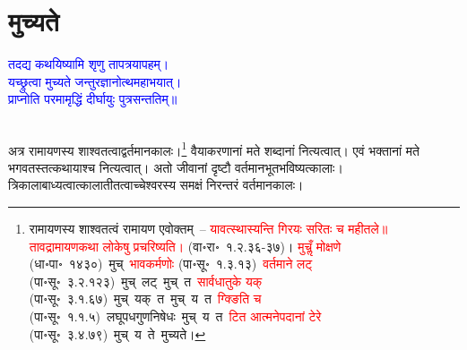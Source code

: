 \section[मुच्यते]{मुच्यते}
\centering\textcolor{blue}{तदद्य कथयिष्यामि शृणु तापत्रयापहम्।\nopagebreak\\
यच्छ्रुत्वा मुच्यते जन्तुरज्ञानोत्थमहाभयात्।\nopagebreak\\
प्राप्नोति परमामृद्धिं दीर्घायुः पुत्रसन्ततिम्॥}\nopagebreak\\
\\
\fontsize{14}{21}\selectfont\begin{sloppypar}\justifying\noindent\hspace{10mm} अत्र रामायणस्य शाश्वतत्वाद्वर्तमान\-कालः।\footnote{रामायणस्य शाश्वतत्वं रामायण एवोक्तम्~– \textcolor{red}{यावत्स्थास्यन्ति गिरयः सरितः च महीतले॥ तावद्रामायणकथा लोकेषु प्रचरिष्यति।} (वा॰रा॰~१.२.३६-३७)। \textcolor{red}{मुचॢँ मोक्षणे} (धा॰पा॰~१४३०)~\arrow मुच्~\arrow \textcolor{red}{भावकर्मणोः} (पा॰सू॰~१.३.१३)~\arrow \textcolor{red}{वर्तमाने लट्} (पा॰सू॰~३.२.१२३)~\arrow मुच्~लट्~\arrow मुच्~त~\arrow \textcolor{red}{सार्वधातुके यक्} (पा॰सू॰~३.१.६७)~\arrow मुच्~यक्~त~\arrow मुच्~य~त~\arrow \textcolor{red}{ग्क्ङिति च} (पा॰सू॰~१.१.५)~\arrow लघूपध\-गुण\-निषेधः~\arrow मुच्~य~त~\arrow \textcolor{red}{टित आत्मनेपदानां टेरे} (पा॰सू॰~३.४.७९)~\arrow मुच्~य~ते~\arrow मुच्यते।} वैयाकरणानां मते शब्दानां नित्यत्वात्। एवं भक्तानां मते भगवतस्तत्कथायाश्च नित्यत्वात्। अतो जीवानां दृष्टौ वर्तमान\-भूत\-भविष्यत्कालाः। त्रिकालाबाध्यत्वात्कालातीतत्वाच्चेश्वरस्य समक्षं निरन्तरं वर्तमान\-कालः।\end{sloppypar}
